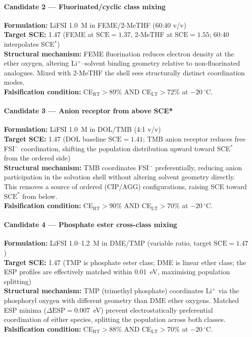\documentclass[11pt]{article}
\theoremstyle{plain}
\theoremstyle{definition}
\theoremstyle{remark}
\begin{document}
\paragraph{Candidate 2 --- Fluorinated/cyclic class mixing}
\textbf{Formulation:} LiFSI 1.0~M in FEME/2-MeTHF (60:40 v/v)\\
\textbf{Target SCE:} 1.47 (FEME at $\mathrm{SCE}=1.37$, 2-MeTHF at $\mathrm{SCE}=1.55$;
60:40 interpolates SCE$^{*}$)\\
\textbf{Structural mechanism:} FEME fluorination reduces electron density at
the ether oxygen, altering Li$^+$--solvent binding geometry relative to
non-fluorinated analogues.  Mixed with 2-MeTHF the shell sees structurally
distinct coordination modes.\\
\textbf{Falsification condition:} CE$_{\mathrm{RT}} > 89\%$ AND
CE$_{\mathrm{LT}} > 72\%$ at $-20\,^{\circ}$C.

\paragraph{Candidate 3 --- Anion receptor from above SCE*}
\textbf{Formulation:} LiFSI 1.0~M in DOL/TMB (4:1 v/v)\\
\textbf{Target SCE:} 1.47 (DOL baseline $\mathrm{SCE}=1.41$; TMB anion receptor
reduces free FSI$^-$ coordination, shifting the population distribution
upward toward SCE$^{*}$ from the ordered side)\\
\textbf{Structural mechanism:} TMB coordinates FSI$^-$ preferentially,
reducing anion participation in the solvation shell without altering solvent
geometry directly.  This removes a source of ordered (CIP/AGG) configurations,
raising SCE toward $\mathrm{SCE}^{*}$ from below.\\
\textbf{Falsification condition:} CE$_{\mathrm{RT}} > 90\%$ AND
CE$_{\mathrm{LT}} > 70\%$ at $-20\,^{\circ}$C.

\paragraph{Candidate 4 --- Phosphate ester cross-class mixing}
\textbf{Formulation:} LiFSI 1.0--1.2~M in DME/TMP (variable ratio, target
$\mathrm{SCE}=1.47$)\\
\textbf{Target SCE:} 1.47 (TMP is phosphate ester class; DME is linear ether
class; the ESP profiles are effectively matched within 0.01~eV, maximising
population splitting)\\
\textbf{Structural mechanism:} TMP (trimethyl phosphate) coordinates Li$^+$
via the phosphoryl oxygen with different geometry than DME ether oxygens.
Matched ESP minima ($\Delta\mathrm{ESP} = 0.007$~eV) prevent electrostatically
preferential coordination of either species, splitting the population across
both classes.\\
\textbf{Falsification condition:} CE$_{\mathrm{RT}} > 88\%$ AND
CE$_{\mathrm{LT}} > 70\%$ at $-20\,^{\circ}$C.
\end{document}
